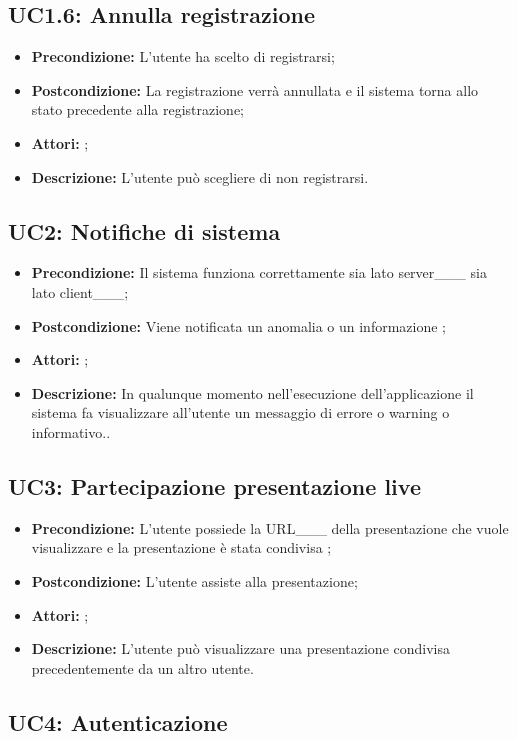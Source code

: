 \subsection{ UC1.6: Annulla registrazione}

\begin{itemize}
	\item \textbf{Precondizione:} L'utente ha scelto di registrarsi;
	\item \textbf{Postcondizione:} La registrazione verrà annullata e il sistema torna allo stato precedente alla registrazione;
	\item \textbf{Attori:} ;
	\item \textbf{Descrizione:} L'utente può scegliere di non registrarsi.
\end{itemize}
\subsection{ UC2: Notifiche di sistema}

\begin{itemize}
	\item \textbf{Precondizione:} Il sistema funziona correttamente sia lato server___ sia lato client___;
	\item \textbf{Postcondizione:} Viene notificata un anomalia o un informazione ;
	\item \textbf{Attori:} ;
	\item \textbf{Descrizione:} In qualunque momento nell'esecuzione dell'applicazione il sistema fa visualizzare all'utente un messaggio di errore o warning o informativo..
\end{itemize}
\subsection{ UC3: Partecipazione presentazione live}

\begin{itemize}
	\item \textbf{Precondizione:} L'utente possiede la URL___ della presentazione che vuole visualizzare e la presentazione è stata condivisa ;
	\item \textbf{Postcondizione:} L'utente assiste alla presentazione;
	\item \textbf{Attori:} ;
	\item \textbf{Descrizione:} L'utente può visualizzare una presentazione condivisa precedentemente da un altro utente.
\end{itemize}
\subsection{ UC4: Autenticazione}

